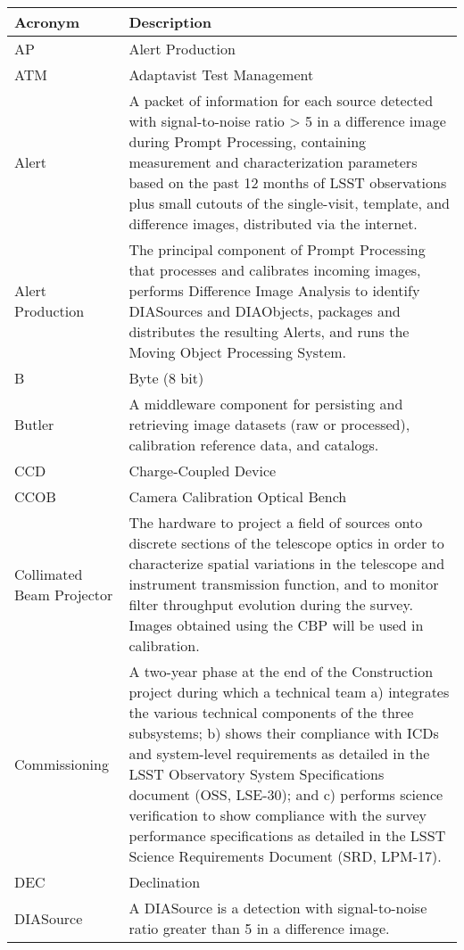 \addtocounter{table}{-1}
\begin{longtable}{|l|p{}|}\hline
\textbf{Acronym} & \textbf{Description}  \\\hline

AP & Alert Production \\\hline
ATM & Adaptavist Test Management \\\hline
Alert & A packet of information for each source detected with signal-to-noise ratio > 5 in a difference image during Prompt Processing, containing measurement and characterization parameters based on the past 12 months of LSST observations plus small cutouts of the single-visit, template, and difference images, distributed via the internet. \\\hline
Alert Production & The principal component of Prompt Processing that processes and calibrates incoming images, performs Difference Image Analysis to identify DIASources and DIAObjects, packages and distributes the resulting Alerts, and runs the Moving Object Processing System. \\\hline
B & Byte (8 bit) \\\hline
Butler & A middleware component for persisting and retrieving image datasets (raw or processed), calibration reference data, and catalogs. \\\hline
CCD & Charge-Coupled Device \\\hline
CCOB & Camera Calibration Optical Bench \\\hline
Collimated Beam Projector & The hardware to project a field of sources onto discrete sections of the telescope optics in order to characterize spatial variations in the telescope and instrument transmission function, and to monitor filter throughput evolution during the survey. Images obtained using the CBP will be used in calibration. \\\hline
Commissioning & A two-year phase at the end of the Construction project during which a technical team a) integrates the various technical components of the three subsystems; b) shows their compliance with ICDs and system-level requirements as detailed in the LSST Observatory System Specifications document (OSS, LSE-30); and c) performs science verification to show compliance with the survey performance specifications as detailed in the LSST Science Requirements Document (SRD, LPM-17). \\\hline
DEC & Declination \\\hline
DIASource & A DIASource is a detection with signal-to-noise ratio greater than 5 in a difference image. \\\hline

\end{longtable}
